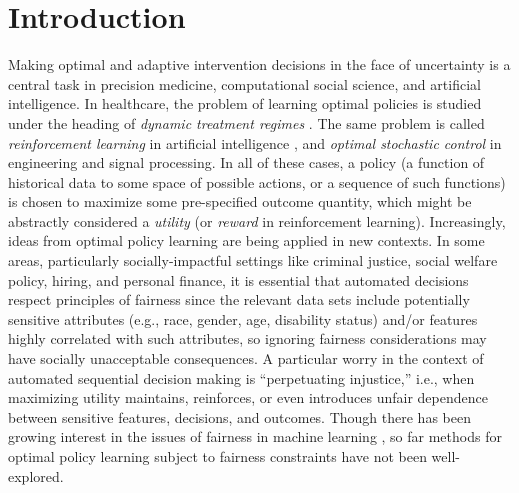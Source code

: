 \documentclass{article}
\begin{document}
\section{Introduction} 
Making optimal and adaptive intervention decisions in the face of uncertainty is a central task in precision medicine, computational social science, and artificial intelligence. In healthcare, the problem of learning optimal policies %
is studied under the heading of \emph{dynamic treatment regimes} \cite{Moodie13DTR}.  The same problem is called \emph{reinforcement learning} in artificial intelligence \cite{sutton98reinforcement}, and \emph{optimal stochastic control} \cite{bertsekas96neuro} in engineering and signal processing. In all of these cases, a policy (a function of historical data to some space of possible actions, or a sequence of such functions) is chosen to maximize some pre-specified outcome quantity, which might be abstractly considered a \emph{utility} (or \emph{reward} in reinforcement learning). Increasingly, ideas from optimal policy learning %
are being applied in new contexts. In some areas, particularly socially-impactful settings like criminal justice, social welfare policy, hiring, and personal finance, it is essential that automated decisions respect principles of fairness since the relevant data sets include potentially sensitive attributes (e.g., race, gender, age, disability status) and/or features highly correlated with such attributes, so ignoring fairness considerations may have socially unacceptable consequences.  A particular worry in the context of automated sequential decision making is ``perpetuating injustice,'' i.e., when maximizing utility maintains, reinforces, or even introduces unfair dependence between sensitive features, decisions, and outcomes. Though there has been growing interest in the issues of fairness in machine learning \cite{pedreshi08discrimination,feldman15certifying,hardt16equality,kamiran13quantifying,corbett2017algorithmic,jabbari16fair,kusner17counterfactual,zhang18fairness,mitchell18speak,Zhang17causal}, so far methods for 
optimal policy learning subject to fairness constraints
have not been well-explored. %
\end{document}
